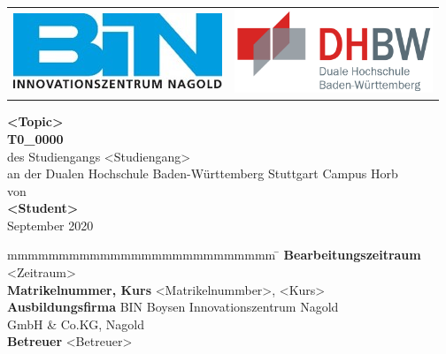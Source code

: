 
\begin{titlepage}
	\begin{longtable}{p{8.2cm} p{5.4cm}}
		\includegraphics{Abbildungen/BIN.jpg} &
		\includegraphics[height=2.5cm]{Abbildungen/dhbw.png}
	\end{longtable}
	\enlargethispage{20mm}
	\begin{center}
		\vspace*{12mm}	\LARGE\textbf{<Topic>}\\
		\vspace*{12mm}	\large\textbf{T0\_0000}\\
		\vspace*{12mm}	des Studiengangs <Studiengang>\\
    \vspace*{3mm}		an der Dualen Hochschule Baden-Württemberg Stuttgart Campus Horb\\
		\vspace*{12mm}	von\\
		\vspace*{3mm}		\large\textbf{<Student>}\\
		\vspace*{12mm}	September 2020\\
	\end{center}
	\vfill
	\begin{spacing}{1.2}
	\begin{tabbing}
		mmmmmmmmmmmmmmmmmmmmmmmmmm             \= \kill
		\textbf{Bearbeitungszeitraum}      		\>  <Zeitraum>\\
		\textbf{Matrikelnummer, Kurs}  			\>  <Matrikelnummber>, <Kurs>\\
		\textbf{Ausbildungsfirma}              \>  BIN Boysen Innovationszentrum Nagold\\
		\> GmbH \& Co.KG, Nagold\\
		\textbf{Betreuer}               		\\
	\end{tabbing}
	\end{spacing}
\end{titlepage}
